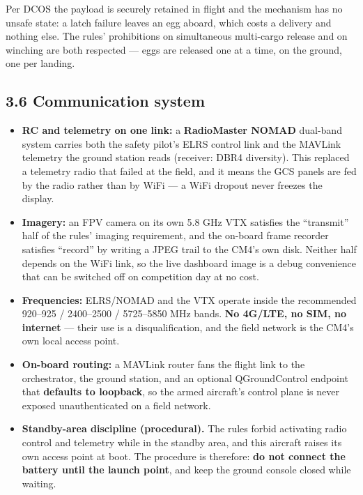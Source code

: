 \documentclass[
  10pt,
  a4paper,
  titlepage]{article}
\providecommand{\tightlist}{%
  \setlength{\itemsep}{0pt}\setlength{\parskip}{0pt}}
\begin{document}
Per DCOS the payload is securely retained in flight and the mechanism
has no unsafe state: a latch failure leaves an egg aboard, which costs a
delivery and nothing else. The rules' prohibitions on simultaneous
multi-cargo release and on winching are both respected --- eggs are
released one at a time, on the ground, one per landing.

\hypertarget{communication-system}{%
\subsection{3.6 Communication system}\label{communication-system}}

\begin{itemize}
\tightlist
\item
  \textbf{RC and telemetry on one link:} a \textbf{RadioMaster NOMAD}
  dual-band system carries both the safety pilot's ELRS control link and
  the MAVLink telemetry the ground station reads (receiver: DBR4
  diversity). This replaced a telemetry radio that failed at the field,
  and it means the GCS panels are fed by the radio rather than by WiFi
  --- a WiFi dropout never freezes the display.
\item
  \textbf{Imagery:} an FPV camera on its own 5.8 GHz VTX satisfies the
  ``transmit'' half of the rules' imaging requirement, and the on-board
  frame recorder satisfies ``record'' by writing a JPEG trail to the
  CM4's own disk. Neither half depends on the WiFi link, so the live
  dashboard image is a debug convenience that can be switched off on
  competition day at no cost.
\item
  \textbf{Frequencies:} ELRS/NOMAD and the VTX operate inside the
  recommended 920--925 / 2400--2500 / 5725--5850 MHz bands. \textbf{No
  4G/LTE, no SIM, no internet} --- their use is a disqualification, and
  the field network is the CM4's own local access point.
\item
  \textbf{On-board routing:} a MAVLink router fans the flight link to
  the orchestrator, the ground station, and an optional QGroundControl
  endpoint that \textbf{defaults to loopback}, so the armed aircraft's
  control plane is never exposed unauthenticated on a field network.
\item
  \textbf{Standby-area discipline (procedural).} The rules forbid
  activating radio control and telemetry while in the standby area, and
  this aircraft raises its own access point at boot. The procedure is
  therefore: \textbf{do not connect the battery until the launch point},
  and keep the ground console closed while waiting.
\end{itemize}
\end{document}
